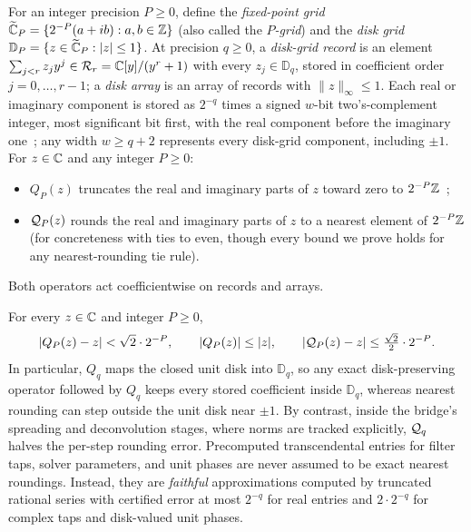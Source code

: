 \begin{definition}\label{def:grid}
For an integer precision $P\ge 0$, define the \emph{fixed-point grid} $\widetilde{\mathbb{C}}_P=\{2^{-P}(a+ib):a,b\in\mathbb{Z}\}$ (also called
the \emph{$P$-grid}) and the \emph{disk grid} $\mathbb{D}_P=\{z\in\widetilde{\mathbb{C}}_P:|z|\le 1\}$. At precision $q\ge 0$, a
\emph{disk-grid record} is an element $\sum_{j<r}z_j y^j\in\mathcal{R}_r=\mathbb{C}[y]/(y^r+1)$ with every $z_j\in\mathbb{D}_q$, stored
in coefficient order $j=0,\dots,r-1$; a \emph{disk array} is an array of records with $\|z\|_\infty\le 1$. Each real or
imaginary component is stored as $2^{-q}$ times a signed $w$-bit two's-complement integer, most significant bit first,
with the real component before the imaginary one~\cite[Prop.~14]{OAI26}; any width $w\ge q+2$ represents every
disk-grid component, including $\pm 1$. For $z\in\mathbb{C}$ and any integer $P\ge 0$:
\begin{itemize}[leftmargin=*]
  \item $Q_P(z)$ truncates the real and imaginary parts of $z$ toward zero to $2^{-P}\mathbb{Z}$~\cite[(26)]{OAI26};
  \item $\mathcal{Q}_P(z)$ rounds the real and imaginary parts of $z$ to a nearest element of $2^{-P}\mathbb{Z}$ (for concreteness
    with ties to even, though every bound we prove holds for any nearest-rounding tie rule).
\end{itemize}
Both operators act coefficientwise on records and arrays.
\end{definition}

For every $z\in\mathbb{C}$ and integer $P\ge 0$,
\begin{equation}\label{eq:rounding}
  |Q_P(z)-z|<\sqrt2\cdot 2^{-P},\qquad |Q_P(z)|\le |z|,\qquad |\mathcal{Q}_P(z)-z|\le\tfrac{\sqrt2}{2}\cdot 2^{-P}.
\end{equation}
In particular, $Q_q$ maps the closed unit disk into $\mathbb{D}_q$, so any exact disk-preserving operator followed by $Q_q$ keeps every stored coefficient inside $\mathbb{D}_q$, whereas nearest rounding can step outside the unit disk near $\pm 1$. By contrast, inside the bridge's spreading and deconvolution stages, where norms are tracked explicitly, $\mathcal{Q}_q$ halves the per-step rounding error. Precomputed transcendental entries for filter taps, solver parameters, and unit phases are never assumed to be exact nearest roundings. Instead, they are \emph{faithful} approximations computed by truncated rational series with certified error at most $2^{-q}$ for real entries and $2\cdot 2^{-q}$ for complex taps and disk-valued unit phases.

